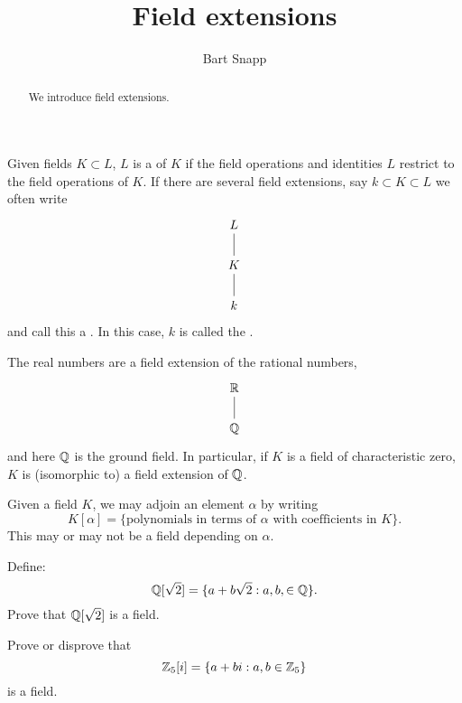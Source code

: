 \documentclass{ximera}
\author{Bart Snapp}
\title{Field extensions}
\begin{document}
\begin{abstract}
  We introduce field extensions.
\end{abstract}
\maketitle




\begin{definition}
  Given fields $K\subset L$, $L$ is a  of $K$ if
  the field operations and identities $L$ restrict to the field
  operations of $K$. If there are several field extensions, say $k
  \subset K \subset L$ we often write
  \[
  \begin{tikzcd}
    L\ar[d,-] \\
    K \ar[d,-]\\
    k
  \end{tikzcd}
  \]
  and call this a . In this case, $k$ is called the .
\end{definition}

\begin{example}
  The real numbers are a field extension of the rational numbers,
  \[
  \begin{tikzcd}
    \R\ar[d,-] \\
    \Q
  \end{tikzcd}
  \]
  and here $\mathbb Q$ is the ground field. In particular, if $K$ is a field
  of characteristic zero, $K$ is (isomorphic to) a field extension of $\mathbb Q$.
\end{example}



\begin{example}
  Given a field $K$, we may adjoin an element $\alpha$ by writing
  \[
  K[\alpha] =\{\text{polynomials in terms of $\alpha$ with
    coefficients in $K$}\}.
  \]
  This may or may not be a field depending on $\alpha$. 
\end{example}

\begin{exercise}
  Define:
  \[
  \mathbb Q[\sqrt{2}] = \{ a+ b\sqrt{2}: a,b,\in\mathbb Q\}.
  \]
  Prove that $\mathbb Q[\sqrt{2}]$ is a field.
\end{exercise}

\begin{exercise}
  Prove or disprove that
  \[
  \mathbb Z_5[i] = \{a + b i: a,b\in\mathbb Z_5\}
  \]
  is a field.
\end{exercise}
\end{document}
